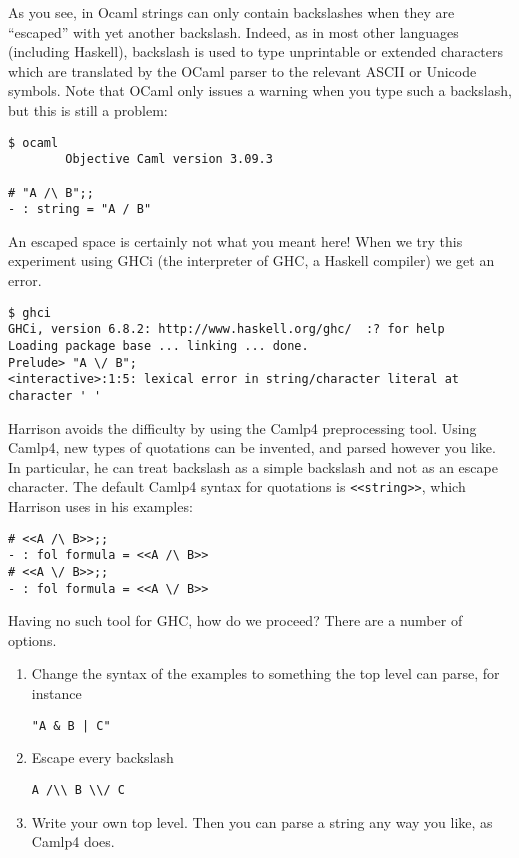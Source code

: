 \documentclass{article}
\begin{document}
\noindent As you see, in Ocaml strings can only contain backslashes when they
are ``escaped'' with yet another backslash. Indeed, as in most other
languages (including Haskell), backslash is used to type unprintable
or extended characters which are translated by the OCaml parser to the
relevant ASCII or Unicode symbols.  
Note that OCaml only issues a warning when you type such
a backslash, but this is still a problem:

\begin{verbatim} 
$ ocaml
        Objective Caml version 3.09.3

# "A /\ B";;
- : string = "A / B"
\end{verbatim} 

\noindent An escaped space is certainly not what you meant here!  
When we try this experiment using GHCi (the interpreter of GHC, a 
Haskell compiler) we get an error.

\begin{verbatim} 
$ ghci
GHCi, version 6.8.2: http://www.haskell.org/ghc/  :? for help
Loading package base ... linking ... done.
Prelude> "A \/ B";
<interactive>:1:5: lexical error in string/character literal at character ' '
\end{verbatim} 

\noindent Harrison avoids the difficulty by using the Camlp4 preprocessing tool.
Using Camlp4, new types of quotations can be invented, and parsed
however you like. In particular, he can treat backslash as a simple
backslash and not as an escape character. The default Camlp4 syntax
for quotations is \texttt{<<string>>}, which Harrison uses in his examples:

\begin{verbatim}  
# <<A /\ B>>;;
- : fol formula = <<A /\ B>>
# <<A \/ B>>;;
- : fol formula = <<A \/ B>>
\end{verbatim} 

\noindent Having no such tool for GHC, how do we proceed?  There are a number
of options.

\begin{enumerate} 
\item Change the syntax of the examples to something the top level 
  can parse, for instance  
\begin{verbatim} 
"A & B | C"
\end{verbatim} 
\item Escape every backslash
\begin{verbatim} 
A /\\ B \\/ C
\end{verbatim} 
\item Write your own top level.  Then you can parse a string
any way you like, as Camlp4 does.  
\end{enumerate} 
\end{document}
